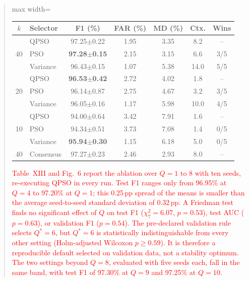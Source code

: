 \documentclass[11pt]{article}
\newenvironment{excerpt}{\begin{quote}\sloppy}{\end{quote}}
\begin{document}
\begin{excerpt}
\begin{table}[H]
\color{black}
\setlength{\tabcolsep}{3pt}
\begin{adjustbox}{max width=\linewidth}
\begin{tabular}{clccccc}
\hline\toprule
$k$ & Selector & F1 (\%) & FAR (\%) & MD (\%) & Ctx. & Wins \\
\hline\toprule
\multirow{3}{*}{40} & QPSO & 97.25$\pm$0.22 & 1.95 & 3.35 & 8.2 & -- \\
 & PSO & \textbf{97.28$\pm$0.15} & 2.15 & 3.15 & 6.6 & 3/5 \\
 & Variance & 96.43$\pm$0.15 & 1.07 & 5.38 & 14.0 & 5/5 \\
\midrule
\multirow{3}{*}{20} & QPSO & \textbf{96.53$\pm$0.42} & 2.72 & 4.02 & 1.8 & -- \\
 & PSO & 96.14$\pm$0.87 & 2.75 & 4.67 & 3.2 & 3/5 \\
 & Variance & 96.05$\pm$0.16 & 1.17 & 5.98 & 10.0 & 4/5 \\
\midrule
\multirow{3}{*}{10} & QPSO & 94.00$\pm$0.64 & 3.42 & 7.91 & 1.6 & -- \\
 & PSO & 94.34$\pm$0.51 & 3.73 & 7.08 & 1.4 & 0/5 \\
 & Variance & \textbf{95.94$\pm$0.30} & 1.15 & 6.18 & 5.0 & 0/5 \\
\midrule
40 & Consensus & 97.27$\pm$0.23 & 2.46 & 2.93 & 8.0 & -- \\
\hline\toprule
\end{tabular}
\end{adjustbox}
\end{table}

\textcolor{red}{Table~XIII
and Fig.~6 report the ablation over $Q=1$ to 8 with
ten seeds, re-executing QPSO in every run. Test F1 ranges only from
96.95\% at $Q=4$ to 97.20\% at $Q=1$; this 0.25\,pp spread of the
means is smaller than the average seed-to-seed standard deviation of
0.32\,pp. A Friedman test finds no significant effect of $Q$ on test
F1 ($\chi^2_7=6.07$, $p=0.53$), test AUC ($p=0.63$), or validation F1
($p=0.54$). The pre-declared validation rule selects $Q^{*}=6$, but
$Q^{*}=6$ is statistically indistinguishable from every other setting
(Holm-adjusted Wilcoxon $p\ge0.59$). It is therefore a reproducible
default selected on validation data, not a stability optimum. The two
settings beyond $Q=8$, evaluated with five seeds each, fall in the same band,
with test F1 of 97.30\% at $Q=9$ and 97.25\% at $Q=10$.}
\end{excerpt}
\end{document}
